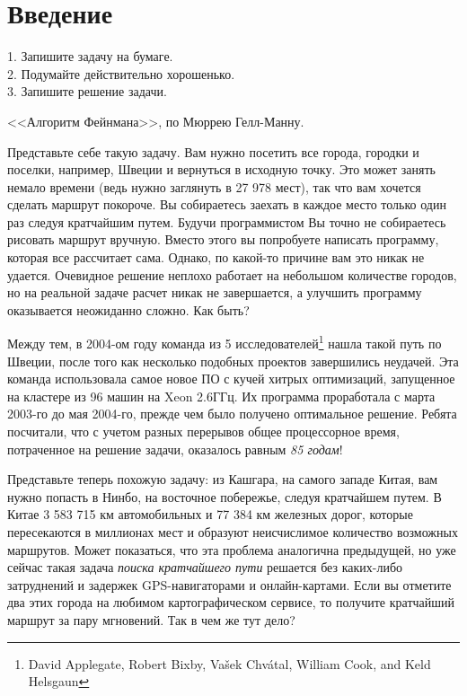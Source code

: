 \chapter{Введение}
\label{chap:intro}

\epigraph{
1. Запишите задачу на бумаге.\\
2. Подумайте действительно хорошенько.\\
3. Запишите решение задачи.
}{<<Алгоритм Фейнмана>>, по Мюррею Гелл-Манну.}


Представьте себе такую задачу. Вам нужно посетить все города, городки и поселки, например, Швеции и вернуться в исходную точку. Это может занять немало времени (ведь нужно заглянуть в 27 978 мест), так что вам хочется сделать маршрут покороче. Вы собираетесь заехать в каждое место только один раз следуя кратчайшим путем. Будучи программистом Вы точно не собираетесь рисовать маршрут вручную. Вместо этого вы попробуете написать программу, которая все рассчитает сама. Однако, по какой-то причине вам это никак не удается. Очевидное решение неплохо работает на небольшом количестве городов, но на реальной задаче расчет никак не завершается, а улучшить программу оказывается неожиданно сложно. Как быть?

Между тем, в 2004-ом году команда из 5 исследователей\footnote{David Applegate, Robert Bixby, Vašek Chvátal, William Cook, and Keld Helsgaun} нашла такой путь по Швеции, после того как несколько подобных проектов завершились неудачей. Эта команда использовала самое новое ПО с кучей хитрых оптимизаций, запущенное на кластере из 96 машин на Xeon 2.6ГГц. Их программа проработала с марта 2003-го до мая 2004-го, прежде чем было получено оптимальное решение. Ребята посчитали, что с учетом разных перерывов общее процессорное время, потраченное на решение задачи, оказалось равным \textit{85 годам}!

Представьте теперь похожую задачу: из Кашгара, на самого западе Китая, вам нужно попасть в Нинбо, на восточное побережье, следуя кратчайшем путем. В Китае 3 583 715 км автомобильных и 77 384 км железных дорог, которые пересекаются в миллионах мест и образуют неисчислимое количество возможных маршрутов. Может показаться, что эта проблема аналогична предыдущей, но уже сейчас такая задача \textit{поиска кратчайшего пути} решается без каких-либо затруднений и задержек GPS-навигаторами и онлайн-картами. Если вы отметите два этих города на любимом картографическом сервисе, то получите кратчайший маршрут за пару мгновений. Так в чем же тут дело?


